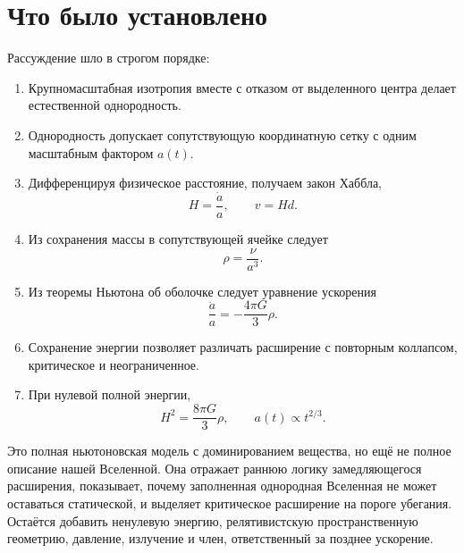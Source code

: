 \section{Что было установлено}

Рассуждение шло в строгом порядке:
\begin{enumerate}
\item Крупномасштабная изотропия вместе с отказом от выделенного центра делает естественной однородность.
\item Однородность допускает сопутствующую координатную сетку с одним масштабным фактором \(a(t)\).
\item Дифференцируя физическое расстояние, получаем закон Хаббла,
  \[
  H=\frac{\dot a}{a},
  \qquad
  v=Hd.
  \]
\item Из сохранения массы в сопутствующей ячейке следует
  \[
  \rho=\frac{\nu}{a^3}.
  \]
\item Из теоремы Ньютона об оболочке следует уравнение ускорения
  \[
  \frac{\ddot a}{a}=-\frac{4\pi G}{3}\rho.
  \]
\item Сохранение энергии позволяет различать расширение с повторным коллапсом, критическое и неограниченное.
\item При нулевой полной энергии,
  \[
  H^2=\frac{8\pi G}{3}\rho,
  \qquad
  a(t)\propto t^{2/3}.
  \]
\end{enumerate}

Это полная ньютоновская модель с доминированием вещества, но ещё не полное описание нашей Вселенной. Она отражает раннюю логику замедляющегося расширения, показывает, почему заполненная однородная Вселенная не может оставаться статической, и выделяет критическое расширение на пороге убегания. Остаётся добавить ненулевую энергию, релятивистскую пространственную геометрию, давление, излучение и член, ответственный за позднее ускорение.
